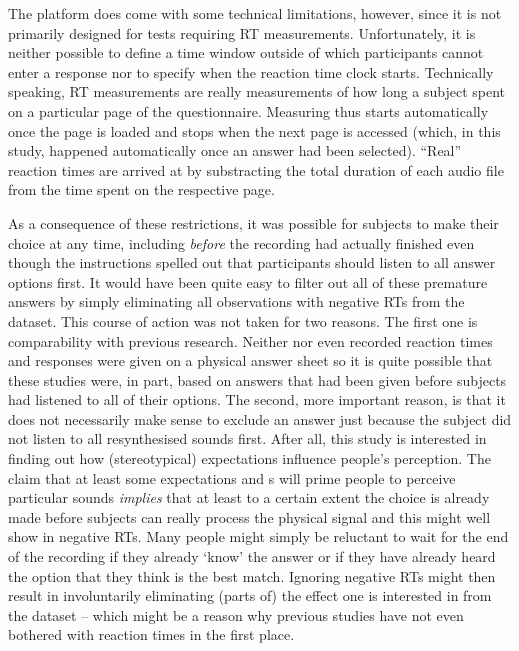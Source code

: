 The platform  does come with some technical limitations, however, since it is not primarily designed for tests requiring RT measurements.
Unfortunately, it is neither possible to define a time window outside of which participants cannot enter a response nor to specify when the reaction time clock starts.
Technically speaking, RT measurements are really measurements of how long a subject spent on a particular page of the questionnaire.
Measuring thus starts automatically once the page is loaded and stops when the next page is accessed (which, in this study, happened automatically once an answer had been selected).
``Real'' reaction times are arrived at by substracting the total duration of each audio file from the time spent on the respective page.

As a consequence of these restrictions, it was possible for subjects to make their choice at any time, including \emph{before} the recording had actually finished even though the instructions spelled out that participants should listen to all answer options first.
It would have been quite easy to filter out all of these premature answers by simply eliminating all observations with negative RTs from the dataset.
This course of action was not taken for two reasons.
The first one is comparability with previous research.
Neither \citealt{niedzielski1999} nor \citealt{hayetal2006b,haydrager2010} even recorded reaction times and responses were given on a physical answer sheet so it is quite possible that these studies were, in part, based on answers that had been given before subjects had listened to all of their options.
The second, more important reason, is that it does not necessarily make sense to exclude an answer just because the subject did not listen to all resynthesised sounds first.
After all, this study is interested in finding out how (stereotypical) expectations influence people's perception.
The claim that at least some expectations and s will prime people to perceive particular sounds \emph{implies} that at least to a certain extent the choice is already made before subjects can really process the physical signal and this might well show in negative RTs.
Many people might simply be reluctant to wait for the end of the recording if they already `know' the answer or if they have already heard the option that they think is the best match.
Ignoring negative RTs might then result in involuntarily eliminating (parts of) the  effect one is interested in from the dataset -- which might be a reason why previous studies have not even bothered with reaction times in the first place.

